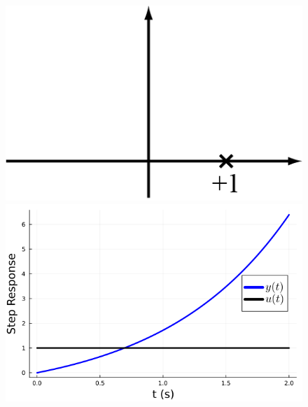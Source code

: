\begin{figure}[hbt]

\begin{minipage}[h]{.46\linewidth}
   \centering
   \includegraphics[width=0.8\linewidth]{graphics/Chap10/UnstableRealPole.png}
\end{minipage}\hfill
\begin{minipage}[h]{.46\linewidth}
   \centering
  \includegraphics[width=0.8\linewidth]{graphics/Chap10/StepUnstableFirstOrder.png}
\end{minipage}


\end{figure}
